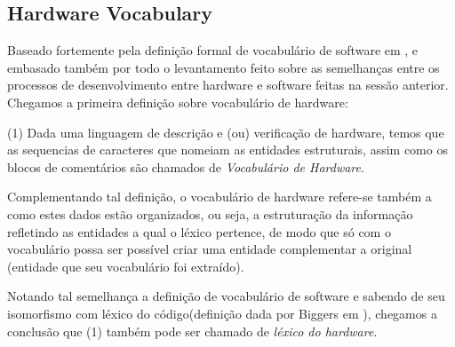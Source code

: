 \documentclass[12pt, twocolumn, a4paper]{article}
\begin{document}
	\subsection{Hardware Vocabulary} 
	
\quad Baseado fortemente pela definição formal de vocabulário de software em  \cite{Santos2015}, e embasado também por todo o levantamento feito sobre as semelhanças entre os processos de desenvolvimento entre hardware e software feitas na sessão anterior. Chegamos a primeira definição sobre vocabulário de hardware:
	
(1) Dada uma linguagem de descrição e (ou) verificação de hardware, temos que as sequencias de caracteres que nomeiam as entidades estruturais, assim como os blocos de comentários são chamados de \textit{Vocabulário de Hardware}.

Complementando tal definição, o vocabulário de hardware refere-se também a como estes dados estão organizados, ou seja, a estruturação da informação refletindo as entidades a qual o léxico pertence, de modo que só com o vocabulário possa ser possível criar uma entidade complementar a original (entidade que seu vocabulário foi extraído).

Notando tal semelhança a definição de vocabulário de software e sabendo de seu isomorfismo com léxico do código(definição dada por Biggers em \cite{Biggers2011}), chegamos a conclusão que (1) também pode ser chamado de \textit{léxico do hardware}.
\end{document}
